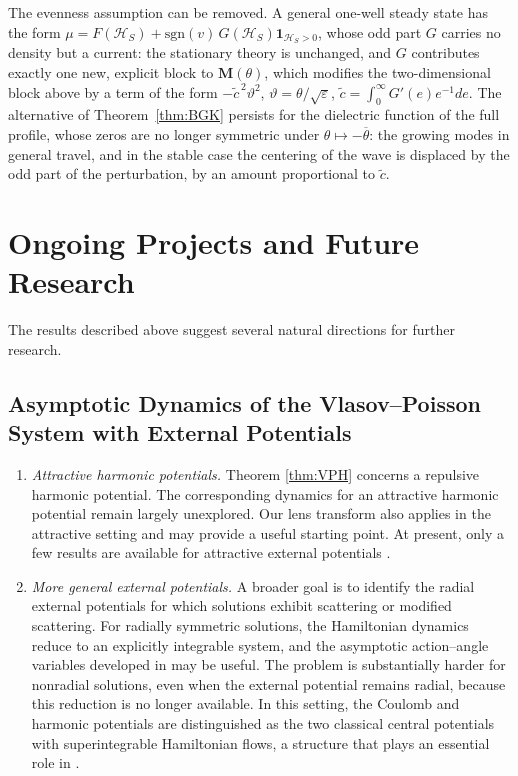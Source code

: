 \documentclass[10pt,reqno]{amsart}
\theoremstyle{definition}
\begin{document}
{The evenness assumption can be removed. A general one-well steady state has the form $\mu=F(\mathcal H_S)+\mathrm{sgn}(v)\,G(\mathcal H_S)\mathbf 1_{\mathcal H_S>0}$, whose odd part $G$ carries no density but a current: the stationary theory is unchanged, and $G$ contributes exactly one new, explicit block to $\mathbf M(\theta)$, which modifies the two-dimensional block above by a term of the form $-\widetilde c^{\,2}\vartheta^2$, $\vartheta=\theta/\sqrt \varepsilon$, $\widetilde c=\int_0^\infty G'(e)e^{-1}de$. The alternative of Theorem~\ref{thm:BGK} persists for the dielectric function of the full profile, whose zeros are no longer symmetric under $\theta\mapsto-\overline\theta$: the growing modes in general travel, and in the stable case the centering of the wave is displaced by the odd part of the perturbation, by an amount proportional to $\widetilde c$.





\section*{Ongoing Projects and Future Research}

The results described above suggest several natural directions for further research.

\subsection*{Asymptotic Dynamics of the Vlasov--Poisson System with External Potentials}

\begin{enumerate}

\item \textit{Attractive harmonic potentials.}
 Theorem \ref{thm:VPH} concerns a repulsive harmonic potential. The corresponding dynamics for an attractive harmonic potential remain largely unexplored. Our lens transform also applies in the attractive setting and may provide a useful starting point. At present, only a few results are available for attractive external potentials \cite{CL22,CL24,KW25}. 

\item \textit{More general external potentials.}
A broader goal is to identify the radial external potentials for which solutions exhibit scattering or modified scattering. For radially symmetric solutions, the Hamiltonian dynamics reduce to an explicitly integrable system, and the asymptotic action--angle variables developed in \cite{PW21,PWY22} may be useful. The problem is substantially harder for nonradial solutions, even when the external potential remains radial, because this reduction is no longer available. In this setting, the Coulomb and harmonic potentials are distinguished as the two classical central potentials with superintegrable Hamiltonian flows, a structure that plays an essential role in \cite{PWY22}.


\end{enumerate}}
\end{document}
